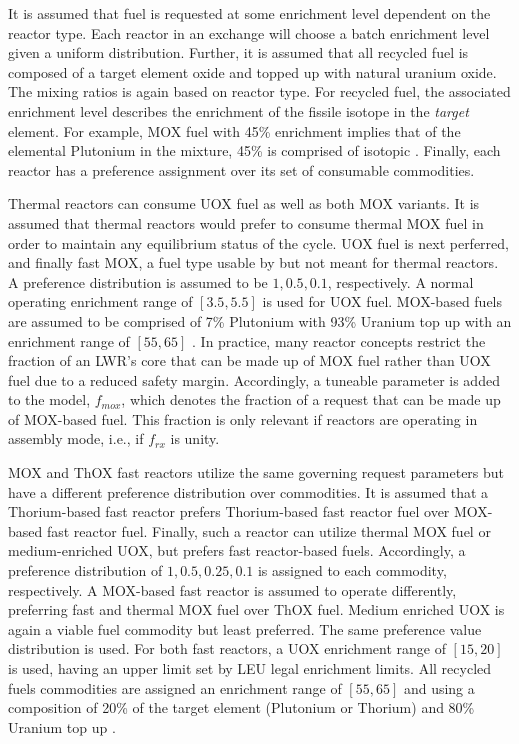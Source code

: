 It is assumed that fuel is requested at some enrichment level dependent on the
reactor type. Each reactor in an exchange will choose a batch enrichment level
given a uniform distribution. Further, it is assumed that all recycled fuel is
composed of a target element oxide and topped up with natural uranium oxide. The
mixing ratios is again based on reactor type. For recycled fuel, the associated
enrichment level describes the enrichment of the fissile isotope in the
\textit{target} element. For example, MOX fuel with 45\% enrichment implies that
of the elemental Plutonium in the mixture, 45\% is comprised of isotopic
. Finally, each reactor has a preference assignment over its set
of consumable commodities.

Thermal reactors can consume UOX fuel as well as both MOX variants. It is
assumed that thermal reactors would prefer to consume thermal MOX fuel in order
to maintain any equilibrium status of the cycle. UOX fuel is next perferred, and
finally fast MOX, a fuel type usable by but not meant for thermal reactors. A
preference distribution is assumed to be ${1, 0.5, 0.1}$, respectively. A normal
operating enrichment range of $[3.5, 5.5]$ is used for UOX fuel. MOX-based fuels
are assumed to be comprised of 7\% Plutonium with 93\% Uranium top up
\cite{bertel2007management} with an enrichment range of $[55, 65]$
\cite{bairiot2003status}. In practice, many reactor concepts restrict the
fraction of an LWR's core that can be made up of MOX fuel rather than UOX fuel
due to a reduced safety margin. Accordingly, a tuneable parameter is added to
the model, $f_{mox}$, which denotes the fraction of a request that can be made
up of MOX-based fuel. This fraction is only relevant if reactors are operating
in assembly mode, i.e., if $f_{rx}$ is unity.

MOX and ThOX fast reactors utilize the same governing request parameters but
have a different preference distribution over commodities. It is assumed that a
Thorium-based fast reactor prefers Thorium-based fast reactor fuel over
MOX-based fast reactor fuel. Finally, such a reactor can utilize thermal MOX
fuel or medium-enriched UOX, but prefers fast reactor-based fuels. Accordingly,
a preference distribution of ${1, 0.5, 0.25, 0.1}$ is assigned to each
commodity, respectively. A MOX-based fast reactor is assumed to operate
differently, preferring fast and thermal MOX fuel over ThOX fuel. Medium
enriched UOX is again a viable fuel commodity but least preferred. The same
preference value distribution is used. For both fast reactors, a UOX enrichment
range of $[15, 20]$ is used, having an upper limit set by LEU legal enrichment
limits. All recycled fuels commodities are assigned an enrichment range of $[55,
  65]$ \cite{bairiot2003status} and using a composition of 20\% of the target
element (Plutonium or Thorium) and 80\% Uranium top up \cite{bairiot2003status}.

